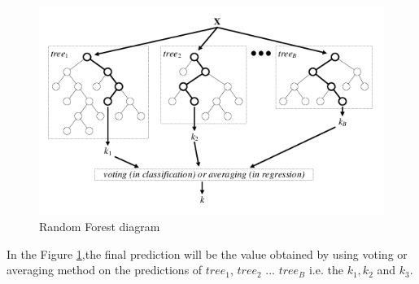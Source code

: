 \begin{figure}[ht]
    \centering
    \includegraphics[width=15cm]{Pictures/random_forest_1.png}
    \caption{Random Forest diagram \cite{randomforest} }
    \label{fig:random_forest}
\end{figure}


In the Figure \ref{fig:random_forest},the final prediction will be the value obtained by using voting or averaging method on the predictions of $tree_1$, $tree_2$ ... $tree_B$ i.e. the $k_1,k_2$ and $k_3$. 